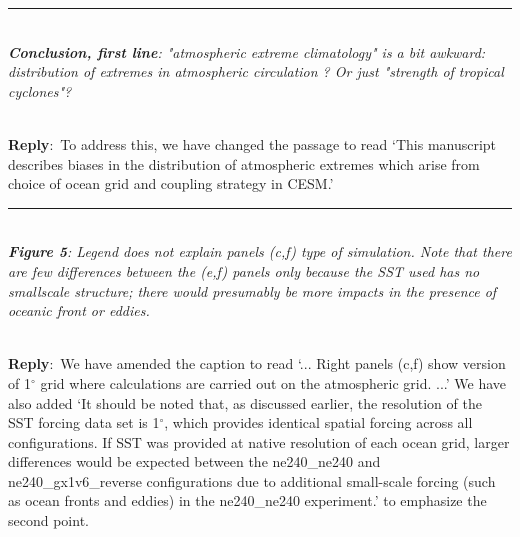 \documentclass{article}
\newcommand{\pointRaised}[2]{\medskip \hrule \noindent \\
               {\itshape {\bfseries #1}: #2}}
\newcommand{\reply}{\noindent \\ \textbf{Reply}:\ }
\newcommand{\degree}{$^{\circ}$}
\begin{document}
\pointRaised{Conclusion, first line}{"atmospheric extreme climatology" is a bit awkward: distribution of extremes in atmospheric circulation ? Or just "strength of tropical cyclones"?}

\reply{To address this, we have changed the passage to read `This manuscript describes biases in the distribution of atmospheric extremes which arise from choice of ocean grid and coupling strategy in CESM.'}

\pointRaised{Figure 5}{Legend does not explain panels (c,f) type of simulation. Note that there are few differences between the (e,f) panels only because the SST used has no smallscale structure; there would presumably be more impacts in the presence of oceanic front or eddies.}

\reply{We have amended the caption to read `... Right panels (c,f) show version of 1\degree{} grid where calculations are carried out on the atmospheric grid. ...'
We have also added `It should be noted that, as discussed earlier, the resolution of the SST forcing data set is 1\degree{}, which provides identical spatial forcing across all configurations. If SST was provided at native resolution of each ocean grid, larger differences would be expected between the ne240\_ne240 and ne240\_gx1v6\_reverse configurations due to additional small-scale forcing (such as ocean fronts and eddies) in the ne240\_ne240 experiment.' to emphasize the second point.}


 
\end{document}
